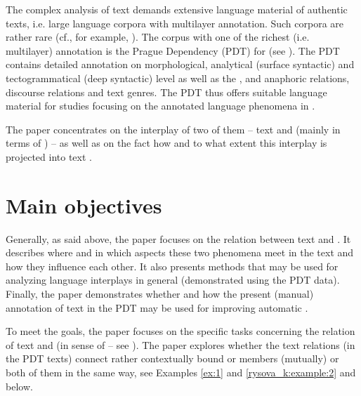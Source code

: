 \documentclass[output=paper]{langsci/langscibook.cls}
\begin{document}
The complex analysis of text  demands extensive language material of authentic texts, i.e. large language corpora with multilayer annotation. Such corpora are rather rare (cf., for example, \citealt{komen2012coreferenced, Stede2014, Chiarcos2014}). The corpus with one of the richest (i.e. multilayer) annotation is the Prague Dependency  (PDT) for  (see \citealt{Bejcek2013}). The PDT contains detailed annotation on morphological, analytical (surface syntactic) and tectogrammatical (deep syntactic) level as well as the ,  and anaphoric relations, discourse relations and text genres. The PDT thus offers suitable language material for studies focusing on the annotated language phenomena in .

The paper concentrates on the interplay of two of them -- text  and  (mainly in terms of ) -- as well as on the fact how and to what extent this interplay is projected into text .

\section{Main objectives\label{rysova_k:sec:MainObjectives}}

Generally, as said above, the paper focuses on the relation between text  and . It describes where and in which aspects these two phenomena meet in the text and how they influence each other. It also presents methods that may be used for analyzing language interplays in general (demonstrated using the PDT data). Finally, the paper demonstrates whether and how the present (manual) annotation of text  in the PDT may be used for improving automatic .

To meet the goals, the paper focuses on the specific tasks concerning the relation of text  and  (in sense of  -- see ). The paper explores whether the text  relations (in the PDT texts) connect rather contextually bound or  members (mutually) or both of them in the same way, see Examples \ref{ex:1} and \ref{rysova_k:example:2} and  below.
\end{document}
